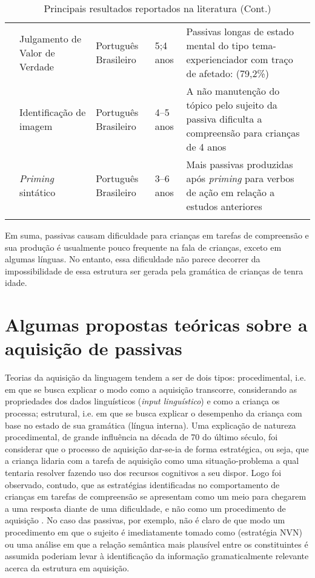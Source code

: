 \documentclass[output=paper]{LSP/langsci}
\begin{document}
\begin{table}
\begin{tabular}{p{2cm}p{2cm}p{1.5cm}p{1cm}p{5cm}}
\citet{limajunioraugusto2014} & Julgamento de Valor de Verdade             & Português Brasileiro & 5;4 anos       & Passivas longas de estado mental do tipo tema-experienciador com traço de afetado: (79,2\%)       \\
\citet{limajunior2016}           & Identificação de imagem                    & Português Brasileiro & 4--5 anos      & A não manutenção do tópico pelo sujeito da passiva dificulta a compreensão para crianças de 4 anos \\
\citet{limajunior2016}          & \textit{Priming} sintático                 & Português Brasileiro & 3--6 anos      &           Mais passivas produzidas após \textit{priming} para verbos de ação em relação a estudos anteriores \\                                                       \lspbottomrule                                
\end{tabular}
\caption{Principais resultados reportados na literatura (Cont.)}
\label{tab:correapassiva_correa3}
\end{table}

Em suma, passivas causam dificuldade para crianças em tarefas de compreensão e sua produção é usualmente pouco frequente na fala de crianças, exceto em algumas línguas. No entanto, essa dificuldade não parece decorrer da impossibilidade de essa estrutura ser gerada pela gramática de crianças de tenra idade. 

\section{Algumas propostas teóricas sobre a aquisição de passivas}
\label{sec:correapassiva_algumas_propostas}

Teorias da aquisição da linguagem tendem a ser de dois tipos: procedimental, i.e. em que se busca explicar o modo como a aquisição transcorre, considerando as propriedades dos dados linguísticos (\textit{input linguístico}) e como a criança os processa; estrutural, i.e. em que se busca explicar o desempenho da criança com base no estado de sua gramática (língua interna). Uma explicação de natureza procedimental, de grande influência na década de 70 do último século, foi considerar que o processo de aquisição dar-se-ia de forma estratégica, ou seja, que a criança lidaria com a tarefa de aquisição como uma situação-problema a qual tentaria resolver fazendo uso dos recursos cognitivos a seu dispor. Logo foi observado, contudo, que as estratégias identificadas no comportamento de crianças em tarefas de compreensão se apresentam como um meio para chegarem a uma resposta diante de uma dificuldade, e não como um procedimento de aquisição \citep{cromer1976}. No caso das passivas, por exemplo, não é claro de que modo um procedimento em que o sujeito é imediatamente tomado como  (estratégia NVN) ou uma análise em que a relação semântica mais plausível entre os constituintes é assumida poderiam levar à identificação da informação gramaticalmente relevante acerca da estrutura em aquisição. 
\end{document}
